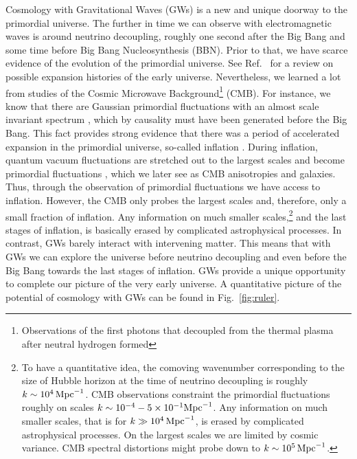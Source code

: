 \documentclass[a4paper,11pt]{article}
\numberwithin{equation}{section}
\begin{document}
Cosmology with Gravitational Waves (GWs) is a new and unique doorway to the primordial universe. The further in time we can observe with electromagnetic waves is around neutrino decoupling, roughly one second after the Big Bang and some time before Big Bang Nucleosynthesis (BBN). Prior to that, we have scarce evidence of the evolution of the primordial universe. See Ref.~\cite{Allahverdi:2020bys} for a review on possible expansion histories of the early universe. Nevertheless, we learned a lot from studies of the Cosmic Microwave Background\footnote{Observations of the first photons that decoupled from the thermal plasma after neutral hydrogen formed} (CMB). For instance, we know that there are Gaussian primordial fluctuations with an almost scale invariant spectrum \cite{Aghanim:2018eyx,Akrami:2018odb}, which by causality must have been generated before the Big Bang. This fact provides strong evidence that there was a period of accelerated expansion in the primordial universe, so-called inflation \cite{Brout:1977ix,Starobinsky:1979ty,Guth:1980zm,Sato:1980yn}. During inflation, quantum vacuum fluctuations are stretched out to the largest scales and become primordial fluctuations \cite{Mukhanov:1981xt,Linde:1981mu,Albrecht:1982wi,Sasaki:1983kd,Kodama:1985bj}, which we later see as CMB anisotropies and galaxies. Thus, through the observation of primordial fluctuations we have access to inflation. However, the CMB only probes the largest scales and, therefore, only a small fraction of inflation. Any information on much smaller scales,\footnote{To have a quantitative idea, the comoving wavenumber corresponding to the size of Hubble horizon at the time of neutrino decoupling is roughly $k\sim 10^{4}\,{\rm Mpc}^{-1}$. CMB observations constraint the primordial fluctuations roughly on scales $k\sim 10^{-4}-5\times 10^{-1}{\rm Mpc}^{-1}$. Any information on much smaller scales, that is for $k\gg10^{4}\,{\rm Mpc}^{-1}$, is erased by complicated astrophysical processes. On the largest scales we are limited by cosmic variance. CMB spectral distortions might probe down to $k\sim10^{5}\,{\rm Mpc}^{-1}$.} and the last stages of inflation, is basically erased by complicated astrophysical processes. In contrast, GWs barely interact with intervening matter. This means that with GWs we can explore the universe before neutrino decoupling and even before the Big Bang towards the last stages of inflation. GWs provide a unique opportunity to complete our picture of the very early universe. A quantitative picture of the potential of cosmology with GWs can be found in Fig.~\ref{fig:ruler}.
\end{document}
